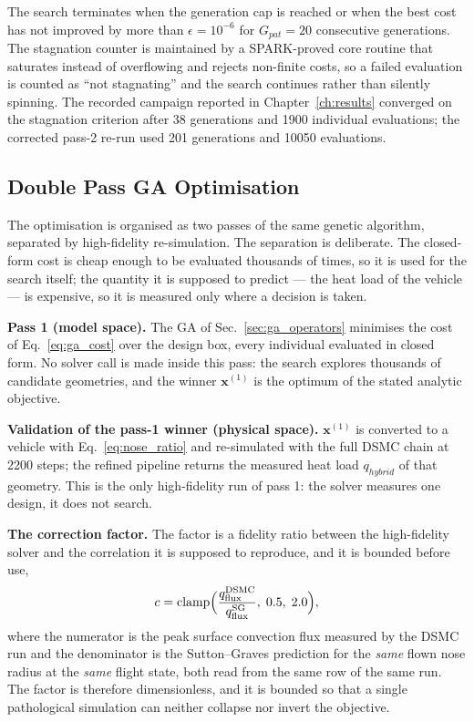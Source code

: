 The search terminates when the generation cap is reached or when the best cost has not improved by more than $\epsilon = 10^{-6}$ for $G_{pat} = 20$ consecutive generations. The stagnation counter is maintained by a SPARK-proved core routine that saturates instead of overflowing and rejects non-finite costs, so a failed evaluation is counted as ``not stagnating'' and the search continues rather than silently spinning. The recorded campaign reported in Chapter~\ref{ch:results} converged on the stagnation criterion after 38 generations and 1900 individual evaluations; the corrected pass-2 re-run used 201 generations and 10050 evaluations.

\subsection{Double Pass GA Optimisation}
\label{sec:double_pass_ga}

The optimisation is organised as two passes of the same genetic algorithm, separated by high-fidelity re-simulation. The separation is deliberate. The closed-form cost is cheap enough to be evaluated thousands of times, so it is used for the search itself; the quantity it is supposed to predict --- the heat load of the vehicle --- is expensive, so it is measured only where a decision is taken.

\textbf{Pass 1 (model space).} The GA of Sec.~\ref{sec:ga_operators} minimises the cost of Eq.~\eqref{eq:ga_cost} over the design box, every individual evaluated in closed form. No solver call is made inside this pass: the search explores thousands of candidate geometries, and the winner $\mathbf{x}^{(1)}$ is the optimum of the stated analytic objective.

\textbf{Validation of the pass-1 winner (physical space).} $\mathbf{x}^{(1)}$ is converted to a vehicle with Eq.~\eqref{eq:nose_ratio} and re-simulated with the full DSMC chain at 2200 steps; the refined pipeline returns the measured heat load $q_{hybrid}$ of that geometry. This is the only high-fidelity run of pass 1: the solver measures one design, it does not search.

\textbf{The correction factor.} The factor is a fidelity ratio between the high-fidelity solver and the correlation it is supposed to reproduce, and it is bounded before use,
\begin{equation}
    c = \operatorname{clamp}\Bigl(\frac{q^{\mathrm{DSMC}}_{\mathrm{flux}}}{q^{\mathrm{SG}}_{\mathrm{flux}}},\;\allowbreak 0.5,\;\allowbreak 2.0\Bigr),
    \label{eq:correction_factor}
\end{equation}
where the numerator is the peak surface convection flux measured by the DSMC run and the denominator is the Sutton--Graves prediction for the \emph{same} flown nose radius at the \emph{same} flight state, both read from the same row of the same run. The factor is therefore dimensionless, and it is bounded so that a single pathological simulation can neither collapse nor invert the objective.

